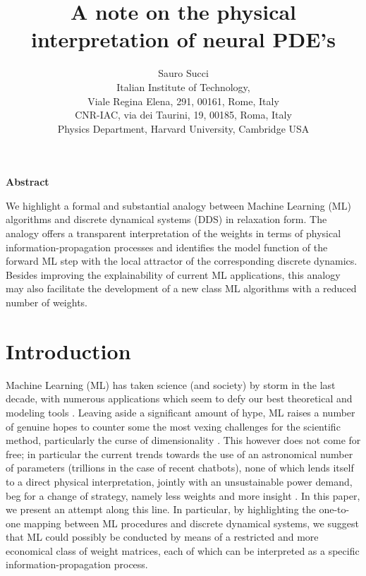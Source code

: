 \documentclass[15pt]{article}
\begin{document}
\addtolength{\textwidth}{2.75in}
\addtolength{\topmargin}{-0.875in}
\addtolength{\textheight}{1.75in}
\title{{\bf A note on the physical interpretation of neural PDE's}}
\author{Sauro Succi\\
Italian Institute of Technology,\\ 
Viale Regina Elena, 291, 00161, Rome, Italy\\
CNR-IAC, via dei Taurini, 19, 00185, Roma, Italy\\
Physics Department, Harvard University, Cambridge USA
}
\maketitle

{\bf Abstract}

\vspace{5mm}

We highlight a formal and substantial analogy between Machine Learning (ML) 
algorithms and discrete dynamical systems (DDS) in relaxation form.
The analogy offers a transparent interpretation of the 
weights in terms of physical information-propagation processes and
identifies the model function of the forward ML
step with the local attractor of the corresponding discrete dynamics.
Besides improving the explainability of current ML applications, this
analogy may also facilitate the development of a new class 
ML algorithms with a reduced number of weights. 

\section{Introduction}

Machine Learning (ML) has taken science (and society) by storm 
in the last decade, with numerous applications which seem
to defy our best theoretical and modeling tools \cite{ML}.
Leaving aside a significant amount of hype, ML raises
a number of genuine hopes to counter some the most 
vexing challenges for the scientific method, particularly
the curse of dimensionality \cite{CoD}.
This however does not come for free; in particular the current
trends towards the use of an astronomical number of parameters
(trillions in the case of recent chatbots), none of which lends 
itself to a direct physical interpretation, jointly with an unsustainable
power demand, beg for a change of strategy, namely less weights and
more insight \cite{CHAT}.
In this paper, we present an attempt along this line.
In particular, by highlighting the one-to-one mapping
between ML procedures and discrete dynamical systems, we
suggest that ML could possibly be conducted by means
of a restricted and more economical class
of weight matrices, each of which can be interpreted as
a specific information-propagation process.     
\end{document}
